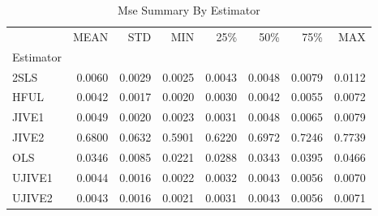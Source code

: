 \begin{table}[ht]
\centering
\caption{Mse Summary By Estimator}
\begin{tabular}{lrrrrrrr}
\toprule
 & MEAN & STD & MIN & 25\% & 50\% & 75\% & MAX \\
Estimator &  &  &  &  &  &  &  \\
\midrule
2SLS & 0.0060 & 0.0029 & 0.0025 & 0.0043 & 0.0048 & 0.0079 & 0.0112 \\
HFUL & 0.0042 & 0.0017 & 0.0020 & 0.0030 & 0.0042 & 0.0055 & 0.0072 \\
JIVE1 & 0.0049 & 0.0020 & 0.0023 & 0.0031 & 0.0048 & 0.0065 & 0.0079 \\
JIVE2 & 0.6800 & 0.0632 & 0.5901 & 0.6220 & 0.6972 & 0.7246 & 0.7739 \\
OLS & 0.0346 & 0.0085 & 0.0221 & 0.0288 & 0.0343 & 0.0395 & 0.0466 \\
UJIVE1 & 0.0044 & 0.0016 & 0.0022 & 0.0032 & 0.0043 & 0.0056 & 0.0070 \\
UJIVE2 & 0.0043 & 0.0016 & 0.0021 & 0.0031 & 0.0043 & 0.0056 & 0.0071 \\
\bottomrule
\end{tabular}
\end{table}
